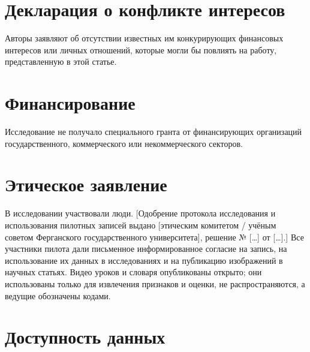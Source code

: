 \documentclass[a4paper,fleqn]{cas-dc}
\begin{document}
\hypertarget{ux434ux435ux43aux43bux430ux440ux430ux446ux438ux44f-ux43e-ux43aux43eux43dux444ux43bux438ux43aux442ux435-ux438ux43dux442ux435ux440ux435ux441ux43eux432}{%
\section*{Декларация о конфликте интересов}\label{ux434ux435ux43aux43bux430ux440ux430ux446ux438ux44f-ux43e-ux43aux43eux43dux444ux43bux438ux43aux442ux435-ux438ux43dux442ux435ux440ux435ux441ux43eux432}}

Авторы заявляют об отсутствии известных им конкурирующих финансовых интересов или личных отношений, которые могли бы повлиять на работу, представленную в этой статье.

\hypertarget{ux444ux438ux43dux430ux43dux441ux438ux440ux43eux432ux430ux43dux438ux435}{%
\section*{Финансирование}\label{ux444ux438ux43dux430ux43dux441ux438ux440ux43eux432ux430ux43dux438ux435}}

Исследование не получало специального гранта от финансирующих организаций государственного, коммерческого или некоммерческого секторов.

\hypertarget{ux44dux442ux438ux447ux435ux441ux43aux43eux435-ux437ux430ux44fux432ux43bux435ux43dux438ux435}{%
\section*{Этическое заявление}\label{ux44dux442ux438ux447ux435ux441ux43aux43eux435-ux437ux430ux44fux432ux43bux435ux43dux438ux435}}

В исследовании участвовали люди. {\color{red}[Одобрение протокола исследования и использования пилотных записей выдано {\color{red}[этическим комитетом / учёным советом Ферганского государственного университета]}, решение № {\color{red}[\ldots]} от {\color{red}[\ldots]}.]} Все участники пилота дали письменное информированное согласие на запись, на использование их данных в исследованиях и на публикацию изображений в научных статьях. Видео уроков и словаря опубликованы открыто; они использованы только для извлечения признаков и оценки, не распространяются, а ведущие обозначены кодами.

\hypertarget{ux434ux43eux441ux442ux443ux43fux43dux43eux441ux442ux44c-ux434ux430ux43dux43dux44bux445}{%
\section*{Доступность данных}\label{ux434ux43eux441ux442ux443ux43fux43dux43eux441ux442ux44c-ux434ux430ux43dux43dux44bux445}}
\end{document}
